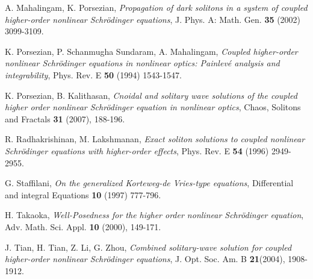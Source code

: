 \documentclass[reqno]{amsart}
\numberwithin{equation}{section}
\begin{document}
\begin{thebibliography}{99}
 A. Mahalingam, K. Porsezian, \textit{Propagation of dark solitons
in a system of coupled higher-order nonlinear Schr\"{o}dinger
equations}, J. Phys. A: Math. Gen. \textbf{35 }(2002) 3099-3109.

 K. Porsezian, P. Schanmugha Sundaram, A. Mahalingam,
\textit{Coupled higher-order nonlinear Schr\"{o}dinger equations
in nonlinear optics: Painlev\'{e} analysis and integrability},
Phys. Rev. E \textbf{50} (1994) 1543-1547.

 K. Porsezian, B. Kalithasan, \textit{Cnoidal and solitary wave
solutions of the coupled higher order nonlinear Schr\"{o}dinger
equation in nonlinear optics}, Chaos, Solitons and Fractals
\textbf{31} (2007), 188-196.

 R. Radhakrishinan, M. Lakshmanan, \textit{Exact soliton solutions
to coupled nonlinear Schr\"{o}dinger equations with higher-order
effects}, Phys. Rev. E \textbf{54} (1996) 2949-2955.

 G. Staffilani, \textit{On the generalized Korteweg-de Vries-type
equations}, Differential and integral Equations \textbf{10 }(1997)
777-796.

 H. Takaoka, \textit{Well-Posedness for the higher order nonlinear
Schr\"{o}dinger equation}, Adv. Math. Sci. Appl. \textbf{10}
(2000), 149-171.

 J. Tian, H. Tian, Z. Li, G. Zhou, \textit{Combined solitary-wave
solution for coupled higher-order nonlinear Schr\"{o}dinger
equations}, J. Opt. Soc. Am. B \textbf{21}(2004), 1908-1912.
\end{thebibliography}
\end{document}
